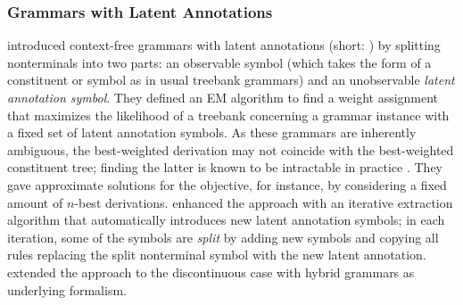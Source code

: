 \documentclass[../document.tex]{subfiles}
\begin{document}
    \subsubsection*{Grammars with Latent Annotations}
     introduced context-free grammars with latent annotations (short: ) by splitting nonterminals into two parts: an observable symbol (which takes the form of a constituent or  symbol as in usual treebank grammars) and an unobservable \emph{latent annotation symbol}.
    They defined an EM algorithm to find a weight assignment that maximizes the likelihood of a treebank concerning a grammar instance with a fixed set of latent annotation symbols.
    As these grammars are inherently ambiguous, the best-weighted derivation may not coincide with the best-weighted constituent tree; finding the latter is known to be intractable in practice \citep[they concluded that finding the best-weighted constituent tree is \emph{NP-hard} in Section~3]{Mat05}.
    They gave approximate solutions for the objective, for instance, by considering a fixed amount of \(n\)-best derivations.
     enhanced the approach with an iterative extraction algorithm that automatically introduces new latent annotation symbols; in each iteration, some of the symbols are \emph{split} by adding new symbols and copying all rules replacing the split nonterminal symbol with the new latent annotation.
     extended the approach to the discontinuous case with hybrid grammars as underlying formalism.
\end{document}
